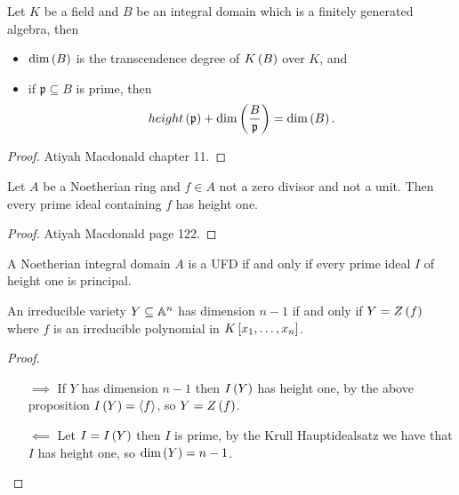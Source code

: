 \begin{proposition}
Let $ K $ be a field and $ B $ be an integral domain which is a finitely generated algebra, then
\begin{itemize}
\item $ \dim\rb{B} $ is the transcendence degree of $ K\rb{B} $ over $ K $, and
\item if $ \mathfrak{p} \subseteq B $ is prime, then
$$ height\rb{\mathfrak{p}} + \dim\rb{\dfrac{B}{\mathfrak{p}}} = \dim\rb{B}. $$
\end{itemize}
\end{proposition}

\begin{proof}
Atiyah Macdonald chapter 11.
\end{proof}

\begin{proposition}
Let $ A $ be a Noetherian ring and $ f \in A $ not a zero divisor and not a unit. Then every prime ideal containing $ f $ has height one.
\end{proposition}

\begin{proof}
Atiyah Macdonald page 122.
\end{proof}


\begin{proposition}
A Noetherian integral domain $ A $ is a UFD if and only if every prime ideal $ I $ of height one is principal.
\end{proposition}

\begin{theorem}
An irreducible variety $ Y \subseteq \A^n $ has dimension $ n - 1 $ if and only if $ Y = Z\rb{f} $ where $ f $ is an irreducible polynomial in $ K\sb{x_1, \dots, x_n} $.
\end{theorem}

\begin{proof}
\hfill
\begin{itemize}
\item[$ \implies $] If $ Y $ has dimension $ n - 1 $ then $ I\rb{Y} $ has height one, by the above proposition $ I\rb{Y} = \ab{f} $, so $ Y = Z\rb{f} $.
\item[$ \impliedby $] Let $ I = I\rb{Y} $ then $ I $ is prime, by the Krull Hauptidealsatz we have that $ I $ has height one, so $ \dim\rb{Y} = n - 1 $.
\end{itemize}
\end{proof}

